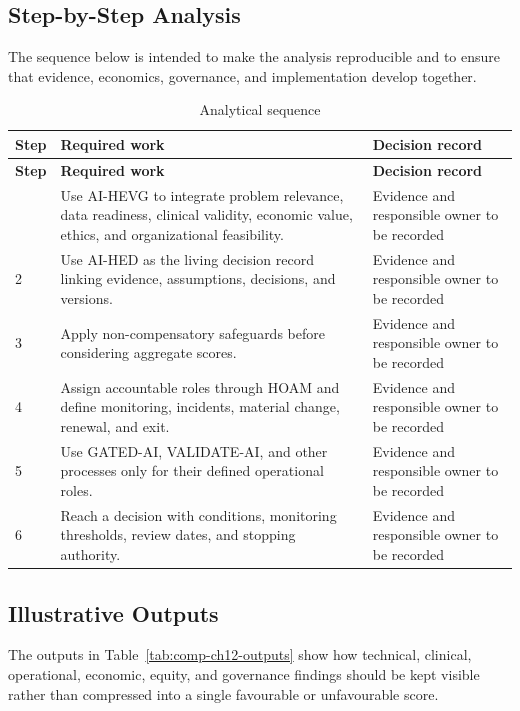 \subsection{Step-by-Step Analysis}
The sequence below is intended to make the analysis reproducible and to ensure
that evidence, economics, governance, and implementation develop together.

\begin{longtable}{@{}p{}p{}p{}@{}}
\caption{Analytical sequence}
\label{tab:comp-ch12-analysis-steps}\\
\toprule
\textbf{Step} & \textbf{Required work} & \textbf{Decision record} \\
\midrule
\endfirsthead
\toprule
\textbf{Step} & \textbf{Required work} & \textbf{Decision record} \\
\midrule
\endhead
\bottomrule
\endlastfoot
1 & Use AI-HEVG to integrate problem relevance, data readiness, clinical validity, economic value, ethics, and organizational feasibility. & Evidence and responsible owner to be recorded \\
2 & Use AI-HED as the living decision record linking evidence, assumptions, decisions, and versions. & Evidence and responsible owner to be recorded \\
3 & Apply non-compensatory safeguards before considering aggregate scores. & Evidence and responsible owner to be recorded \\
4 & Assign accountable roles through HOAM and define monitoring, incidents, material change, renewal, and exit. & Evidence and responsible owner to be recorded \\
5 & Use GATED-AI, VALIDATE-AI, and other processes only for their defined operational roles. & Evidence and responsible owner to be recorded \\
6 & Reach a decision with conditions, monitoring thresholds, review dates, and stopping authority. & Evidence and responsible owner to be recorded \\
\end{longtable}

\subsection{Illustrative Outputs}
The outputs in Table~\ref{tab:comp-ch12-outputs} show how technical,
clinical, operational, economic, equity, and governance findings should be kept
visible rather than compressed into a single favourable or unfavourable score.

